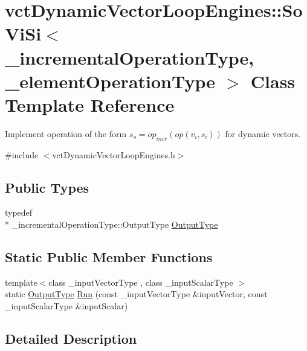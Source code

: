 \hypertarget{classvct_dynamic_vector_loop_engines_1_1_so_vi_si}{\section{vct\-Dynamic\-Vector\-Loop\-Engines\-:\-:So\-Vi\-Si$<$ \-\_\-incremental\-Operation\-Type, \-\_\-element\-Operation\-Type $>$ Class Template Reference}
\label{classvct_dynamic_vector_loop_engines_1_1_so_vi_si}
}


Implement operation of the form $s_o = op_{incr}(op(v_i, s_i))$ for dynamic vectors.  




{\ttfamily \#include $<$vct\-Dynamic\-Vector\-Loop\-Engines.\-h$>$}

\subsection*{Public Types}
\begin{DoxyCompactItemize}
\item 
typedef \\*
\-\_\-incremental\-Operation\-Type\-::\-Output\-Type \hyperlink{classvct_dynamic_vector_loop_engines_1_1_so_vi_si_a331ca8ec7bde5a60281e490a5d8c396a}{Output\-Type}
\end{DoxyCompactItemize}
\subsection*{Static Public Member Functions}
\begin{DoxyCompactItemize}
\item 
{\footnotesize template$<$class \-\_\-input\-Vector\-Type , class \-\_\-input\-Scalar\-Type $>$ }\\static \hyperlink{classvct_dynamic_vector_loop_engines_1_1_so_vi_si_a331ca8ec7bde5a60281e490a5d8c396a}{Output\-Type} \hyperlink{classvct_dynamic_vector_loop_engines_1_1_so_vi_si_ab3ca377ecc892e18570f076476c63b1e}{Run} (const \-\_\-input\-Vector\-Type \&input\-Vector, const \-\_\-input\-Scalar\-Type \&input\-Scalar)
\end{DoxyCompactItemize}


\subsection{Detailed Description}
